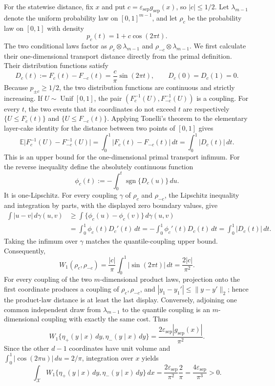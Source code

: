For the statewise distance, fix \(x\) and put \(c=\varepsilon_{\mathrm{sep}}g_{\mathrm{sep}}(x)\), so \(|c|\le1/2\).  Let \(\lambda_{m-1}\) denote the uniform probability law on \([0,1]^{m-1}\), and let \(\rho_c\) be the probability law on \([0,1]\) with density
\[
p_c(t)=1+c\cos(2\pi t).
\]
The two conditional laws factor as \(\rho_c\otimes\lambda_{m-1}\) and \(\rho_{-c}\otimes\lambda_{m-1}\).  We first calculate their one-dimensional transport distance directly from the primal definition.  Their distribution functions satisfy
\[
D_c(t):=F_c(t)-F_{-c}(t)=\frac{c}{\pi}\sin(2\pi t),
\qquad D_c(0)=D_c(1)=0.
\]
Because \(p_{\pm c}\ge1/2\), the two distribution functions are continuous and strictly increasing.  If \(U\sim\operatorname{Unif}[0,1]\), the pair \((F_c^{-1}(U),F_{-c}^{-1}(U))\) is a coupling.  For every \(t\), the two events that its coordinates do not exceed \(t\) are respectively \(\{U\le F_c(t)\}\) and \(\{U\le F_{-c}(t)\}\).  Applying Tonelli's theorem to the elementary layer-cake identity for the distance between two points of \([0,1]\) gives
\[
\mathbb E\bigl|F_c^{-1}(U)-F_{-c}^{-1}(U)\bigr|
=\int_0^1|F_c(t)-F_{-c}(t)|\,dt
=\int_0^1|D_c(t)|\,dt.
\]
This is an upper bound for the one-dimensional primal transport infimum.  For the reverse inequality define the absolutely continuous function
\[
\phi_c(t):=-\int_0^t\operatorname{sgn}\{D_c(u)\}\,du.
\]
It is one-Lipschitz.  For every coupling \(\gamma\) of \(\rho_c\) and \(\rho_{-c}\), the Lipschitz inequality and integration by parts, with the displayed zero boundary values, give
\[
\begin{aligned}
\int|u-v|\,d\gamma(u,v)
&\ge \int\{\phi_c(u)-\phi_c(v)\}\,d\gamma(u,v)\\
&=\int_0^1\phi_c(t)D_c'(t)\,dt
=-\int_0^1\phi_c'(t)D_c(t)\,dt
=\int_0^1|D_c(t)|\,dt.
\end{aligned}
\]
Taking the infimum over \(\gamma\) matches the quantile-coupling upper bound.  Consequently,
\[
W_1(\rho_c,\rho_{-c})
=\frac{|c|}{\pi}\int_0^1|\sin(2\pi t)|\,dt
=\frac{2|c|}{\pi^2}.
\]
For every coupling of the two \(m\)-dimensional product laws, projection onto the first coordinate produces a coupling of \(\rho_c,\rho_{-c}\), and \(|y_1-y_1'|\le\|y-y'\|_2\); hence the product-law distance is at least the last display.  Conversely, adjoining one common independent draw from \(\lambda_{m-1}\) to the quantile coupling is an \(m\)-dimensional coupling with exactly the same cost.  Thus
\[
W_1\{\eta_+(y\mid x)\,dy,\eta_-(y\mid x)\,dy\}
=\frac{2\varepsilon_{\mathrm{sep}}|g_{\mathrm{sep}}(x)|}{\pi^2}.
\]
Since the other \(d-1\) coordinates have unit volume and \(\int_0^1|\cos(2\pi u)|\,du=2/\pi\), integration over \(x\) yields
\[
\int_{\mathcal X}W_1\{\eta_+(y\mid x)\,dy,\eta_-(y\mid x)\,dy\}\,dx
=\frac{2\varepsilon_{\mathrm{sep}}}{\pi^2}\frac{2}{\pi}
=\frac{4\varepsilon_{\mathrm{sep}}}{\pi^3}>0.
\]

